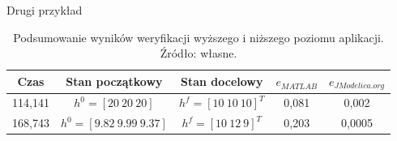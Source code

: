 Drugi przykład

\begin{table}[htp]
    \centering
    \begin{tabular}{|c|c|c|c|c|}
        \hline 
        \textbf{Czas} & \textbf{Stan początkowy} & \textbf{Stan docelowy} & \textbf{$e_{MATLAB}$} & \textbf{$e_{JModelica.org}$} \\
        \hline 
        114,141 & $h^{0} = [20~ 20~ 20]$ & $h^{f} = [10 ~10~ 10]^{T}$ & 0,081 & 0,002 \\ 
        \hline 
        168,743 & $h^{0} = [9.82~ 9.99~ 9.37]$ & $h^{f} = [10 ~12~ 9]^{T}$ & 0,203 & 0,0005 \\ 
        \hline 
    \end{tabular}
    \caption{Podsumowanie wyników weryfikacji wyższego i niższego poziomu aplikacji. Źródło: własne.}
    \label{tab:extctrl2opts}
\end{table}